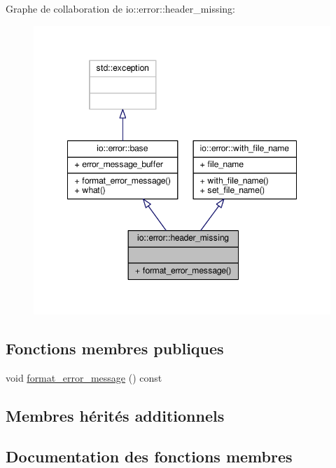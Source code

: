 Graphe de collaboration de io\+:\+:error\+:\+:header\+\_\+missing\+:\nopagebreak
\begin{figure}[H]
\begin{center}
\leavevmode
\includegraphics[width=348pt]{structio_1_1error_1_1header__missing__coll__graph}
\end{center}
\end{figure}
\subsection*{Fonctions membres publiques}
\begin{DoxyCompactItemize}
\item 
void \hyperlink{structio_1_1error_1_1header__missing_ae130d632556617cf136cc4392b517b30}{format\+\_\+error\+\_\+message} () const
\end{DoxyCompactItemize}
\subsection*{Membres hérités additionnels}


\subsection{Documentation des fonctions membres}
\mbox{\label{structio_1_1error_1_1header__missing_ae130d632556617cf136cc4392b517b30}} 
